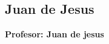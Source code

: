 \documentclass{article}
\begin{document}

\clearpage  %

\setcounter{page}{1}

\subsection{Juan de Jesus}
\vspace*{.1cm}

\begin{flushright}
    {\LARGE \textbf{\textcolor{headercolor}{Profesor}: Juan de jesus}}
\end{flushright}
\vspace{1cm}
\end{document}
